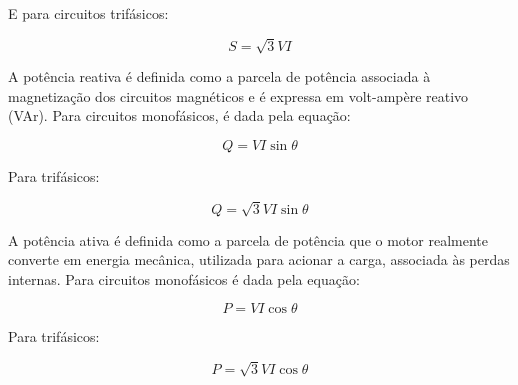 E para circuitos trifásicos:

$$S = \sqrt{3}{VI}$$

A potência reativa é definida como a parcela de potência associada à magnetização dos
circuitos magnéticos e é expressa em volt-ampère reativo (VAr). Para circuitos monofásicos, é dada pela equação:

$$Q = VI \sin{\theta}$$

Para trifásicos:

$$Q = \sqrt{3}{VI} \sin{\theta}$$

A potência ativa é definida como a parcela de potência que o motor realmente converte em
energia mecânica, utilizada para acionar a carga, associada às perdas internas. Para circuitos monofásicos é dada pela equação:

$$P = VI \cos{\theta}$$

Para trifásicos:

$$P = \sqrt{3} VI \cos{\theta}$$

